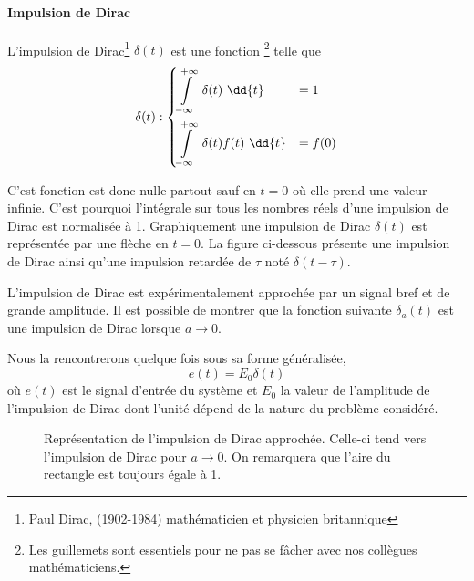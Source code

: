 \paragraph{Impulsion de Dirac}

L'impulsion de Dirac\footnote{Paul Dirac, (1902-1984) mathématicien et 
physicien britannique} $\delta(t)$ est une \og fonction\fg 
\footnote{Les guillemets sont essentiels pour ne pas se fâcher avec nos collègues mathématiciens.} telle que
\begin{align*}
\delta(t) : 
\begin{dcases}
	\int\limits_{-\infty}^{+\infty}	 \delta(t)\,\,\dd{t}&=1   \\
\int\limits_{-\infty}^{+\infty}  \delta(t)f(t)\,\,\dd{t}&=f(0)	
\end{dcases}
\end{align*}

C'est fonction est donc nulle partout sauf en $t=0$ où elle prend 
une valeur infinie. C'est pourquoi l'intégrale sur tous les nombres réels d'une impulsion 
de Dirac est normalisée à 1.
Graphiquement une impulsion de Dirac $\delta(t)$ est 
représentée par une flèche en $t=0$. La figure ci-dessous présente 
une impulsion de Dirac ainsi qu'une 
impulsion retardée de $\tau$ noté $\delta(t-\tau)$.

\begin{figure}[!h]
\begin{center}

\end{center}
\end{figure}

L'impulsion de Dirac est expérimentalement approchée par un signal 
bref et de grande amplitude. Il est possible de montrer que la fonction
suivante $\delta_a(t)$ est une impulsion de Dirac lorsque $a\to0$.

Nous la rencontrerons quelque fois sous sa forme généralisée, 
$$
e(t)=E_0\delta(t)
$$
où $e(t)$ est le signal d'entrée du système et $E_0$ la valeur de l'amplitude de l'impulsion de Dirac
dont l'unité dépend de la nature du problème considéré.
\begin{figure}[!h]
\begin{center}

    \caption{Représentation de l'impulsion de Dirac approchée. 
    Celle-ci tend vers l'impulsion de Dirac pour $a\to0$. On remarquera que l'aire du rectangle est toujours égale à 1.\label{fig-dirac2}}
\end{center}
\end{figure}

